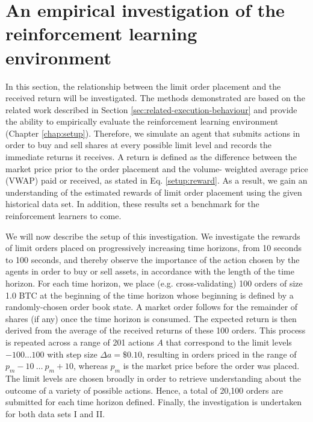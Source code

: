 \section{An empirical investigation of the reinforcement learning environment}
\label{sec:eval-empirical}
In this section, the relationship between the limit order placement and the received return will be investigated.
The methods demonstrated are based on the related work described in Section \ref{sec:related-execution-behaviour} and provide the ability to empirically evaluate the reinforcement learning environment (Chapter \ref{chap:setup}).
Therefore, we simulate an agent that submits actions in order to buy and sell shares at every possible limit level and records the immediate returns it receives.
A return is defined as the difference between the market price prior to the order placement and the volume- weighted average price (VWAP) paid or received, as stated in Eq. \ref{setup:reward}.
As a result, we gain an understanding of the estimated rewards of limit order placement using the given historical data set.
In addition, these results set a benchmark for the reinforcement learners to come.

We will now describe the setup of this investigation.
We investigate the rewards of limit orders placed on progressively increasing time horizons, from 10 seconds to 100 seconds, and thereby observe the importance of the action chosen by the agents in order to buy or sell assets, in accordance with the length of the time horizon.
For each time horizon, we place (e.g. cross-validating) 100 orders of size 1.0 BTC at the beginning of the time horizon whose beginning is defined by a randomly-chosen order book state. 
A market order follows for the remainder of shares (if any) once the time horizon is consumed.
The expected return is then derived from the average of the received returns of these 100 orders.
This process is repeated across a range of 201 actions $A$ that correspond to the limit levels $-100...100$ with step size $\Delta{a} = \$0.10$, resulting in orders priced in the range of $p_m-10 \ \dots \ p_m+10$, whereas $p_m$ is the market price before the order was placed.
The limit levels are chosen broadly in order to retrieve understanding about the outcome of a variety of possible actions.
Hence, a total of 20,100 orders are submitted for each time horizon defined.
Finally, the investigation is undertaken for both data sets I and II.

